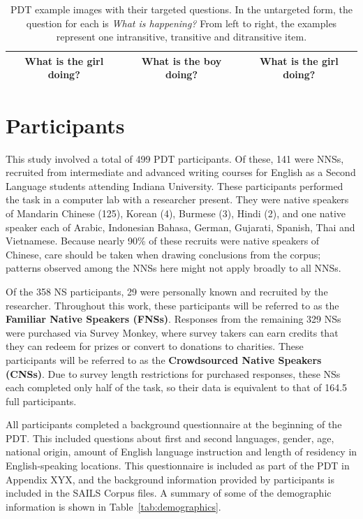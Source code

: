 \begin{table}[htb!]
\begin{center}
\begin{tabular}{|c|c|c|}
\hline
What is the girl doing? & What is the boy doing? & What is the girl doing? \\
\hline
\end{tabular}
\caption{\label{tab:example-pdt-items} PDT example images with their targeted questions. In the untargeted form, the question for each is \textit{What is happening?} From left to right, the examples represent one intransitive, transitive and ditransitive item.}
\end{center}
\end{table}


\section{Participants}
\label{sec:participants}

This study involved a total of 499 PDT participants. Of these, 141 were NNSs, recruited from intermediate and advanced writing courses for English as a Second Language students attending Indiana University. These participants performed the task in a computer lab with a researcher present. They were native speakers of Mandarin Chinese (125), Korean (4), Burmese (3), Hindi (2), and one native speaker each of Arabic, Indonesian Bahasa, German, Gujarati, Spanish, Thai and Vietnamese. Because nearly 90\% of these recruits were native speakers of Chinese, care should be taken when drawing conclusions from the corpus; patterns observed among the NNSs here might not apply broadly to all NNSs. 

Of the 358 NS participants, 29 were personally known and recruited by the researcher. Throughout this work, these participants will be referred to as the \textbf{Familiar Native Speakers (FNSs)}. Responses from the remaining 329 NSs were purchased via Survey Monkey, where survey takers can earn credits that they can redeem for prizes or convert to donations to charities. These participants will be referred to as the \textbf{Crowdsourced Native Speakers (CNSs)}. Due to survey length restrictions for purchased responses, these NSs each completed only half of the task, so their data is equivalent to that of 164.5 full participants.

All participants completed a background questionnaire at the beginning of the PDT. This included questions about first and second languages, gender, age, national origin, amount of English language instruction and length of residency in English-speaking locations. This questionnaire is included as part of the PDT in Appendix XYX, and the background information provided by participants is included in the SAILS Corpus files.  A summary of some of the demographic information is shown in Table~\ref{tab:demographics}.

